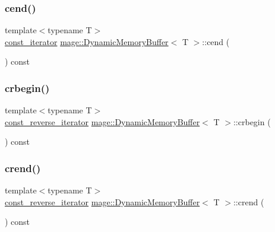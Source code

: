 \subsubsection{\texorpdfstring{cend()}{cend()}}
{\footnotesize\ttfamily template$<$typename T$>$ \\
\mbox{\hyperlink{classmage_1_1_dynamic_memory_buffer_ad6f32f829dcde2a912f53ed18080ab9c}{const\+\_\+iterator}} \mbox{\hyperlink{classmage_1_1_dynamic_memory_buffer}{mage\+::\+Dynamic\+Memory\+Buffer}}$<$ T $>$\+::cend (\begin{DoxyParamCaption}{ }\end{DoxyParamCaption}) const\hspace{0.3cm}{\ttfamily [noexcept]}}

\mbox{\label{classmage_1_1_dynamic_memory_buffer_a4acb9c43e67a5423070c12e84962ea80}} 
\subsubsection{\texorpdfstring{crbegin()}{crbegin()}}
{\footnotesize\ttfamily template$<$typename T$>$ \\
\mbox{\hyperlink{classmage_1_1_dynamic_memory_buffer_a962256bdb2b82436843d71ade7e4d7ee}{const\+\_\+reverse\+\_\+iterator}} \mbox{\hyperlink{classmage_1_1_dynamic_memory_buffer}{mage\+::\+Dynamic\+Memory\+Buffer}}$<$ T $>$\+::crbegin (\begin{DoxyParamCaption}{ }\end{DoxyParamCaption}) const\hspace{0.3cm}{\ttfamily [noexcept]}}

\mbox{\label{classmage_1_1_dynamic_memory_buffer_aae25cfe66dab4ce554aad9cfbc3aa56f}} 
\subsubsection{\texorpdfstring{crend()}{crend()}}
{\footnotesize\ttfamily template$<$typename T$>$ \\
\mbox{\hyperlink{classmage_1_1_dynamic_memory_buffer_a962256bdb2b82436843d71ade7e4d7ee}{const\+\_\+reverse\+\_\+iterator}} \mbox{\hyperlink{classmage_1_1_dynamic_memory_buffer}{mage\+::\+Dynamic\+Memory\+Buffer}}$<$ T $>$\+::crend (\begin{DoxyParamCaption}{ }\end{DoxyParamCaption}) const\hspace{0.3cm}{\ttfamily [noexcept]}}

